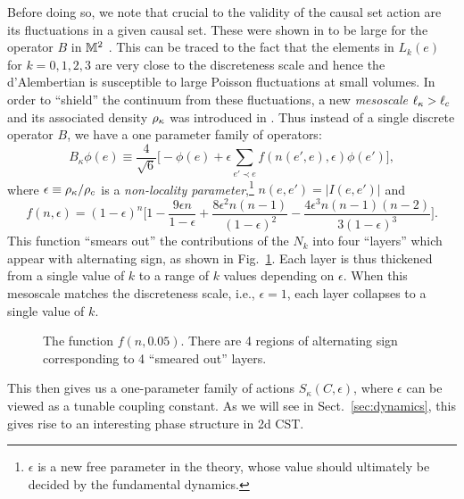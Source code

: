 Before doing so, we note that crucial to the validity of the causal set action are its fluctuations in a given causal
set. These were shown in \cite{sorkinnonlocal} to be large for the operator $B$ in $\mathbb M^2$ . This can be traced to the
fact that the elements in $L_k(e)$ for $k=0,1,2,3$ are very close to the discreteness scale and hence the d'Alembertian
is susceptible to  large Poisson fluctuations at small volumes. In order to ``shield'' the continuum from these
fluctuations, a new \emph{mesoscale} $\ell_\kappa > \ell_c$ and its associated density $\rho_\kappa$ %
was introduced in \cite{sorkinnonlocal}. 
Thus instead of a single discrete operator $B$, we have a one parameter family of
operators:
\begin{equation} 
B_\kappa\phi(e) \equiv \frac{4}{\sqrt{6}}\biggl[-\phi(e)  + \epsilon \sum_{e'\prec e} f(n(e',e), \epsilon) \phi(e')\biggr],  
\label{eq:bkoperator}
\end{equation} 
where $\epsilon \equiv {\rho_\kappa}/{\rho_c}$  is a \emph{non-locality parameter},\footnote{$\epsilon$ is a new free parameter in the theory, whose 
value should  ultimately be decided by the fundamental dynamics.} $n(e,e')=|I(e,e')| $ and 
\begin{equation} 
f(n,\epsilon) = (1-\epsilon)^n\biggl[1-\frac{9\epsilon n}{1-\epsilon} +  \frac{8\epsilon^2 n(n-1)}{(1-\epsilon)^2} -
\frac{4\epsilon^3 n(n-1)(n-2)}{3(1-\epsilon)^3} \biggr]. 
\end{equation}   
This function ``smears out'' the contributions of the $N_k$ into four ``layers'' which appear with alternating
sign, as shown in  Fig.~\ref{fne4d.fig}. Each layer is thus thickened from a single value of $k$ to a range of $k$
values depending on $\epsilon$. When this mesoscale matches the discreteness scale, i.e., $\epsilon=1$, each layer
collapses to a single value of $k$.  
\begin{figure}[ht]
  \centering {} \hskip 0.1cm 
  \caption{The function $f(n,0.05)$. There are 4 regions of alternating sign corresponding to 4
  ``smeared out'' layers.}
\label{fne4d.fig}
\end{figure}
This then gives us a one-parameter family of actions $S_\kappa(C,\epsilon)$, where  $\epsilon$ can be viewed as a tunable
coupling constant.  As we will see in  Sect.~\ref{sec:dynamics}, this gives rise to an interesting phase structure in 2d CST. 


